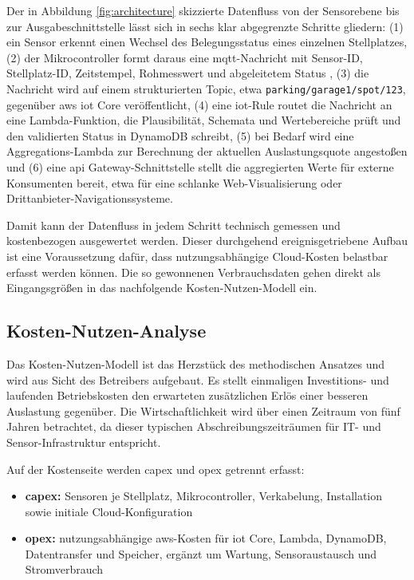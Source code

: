 Der in Abbildung \ref{fig:architecture} skizzierte Datenfluss von der Sensorebene bis zur Ausgabeschnittstelle lässt sich in sechs klar abgegrenzte Schritte gliedern:
(1) ein Sensor erkennt einen Wechsel des Belegungsstatus eines einzelnen Stellplatzes,
(2) der Mikrocontroller formt daraus eine \ac{mqtt}-Nachricht mit Sensor-ID, Stellplatz-ID, Zeitstempel, Rohmesswert und abgeleitetem Status \citep{sarkerSmartParkingSystem2020},
(3) die Nachricht wird auf einem strukturierten Topic, etwa \texttt{parking/garage1/spot/123}, gegenüber \ac{aws} \ac{iot} Core veröffentlicht,
(4) eine \ac{iot}-Rule routet die Nachricht an eine Lambda-Funktion, die Plausibilität, Schemata und Wertebereiche prüft und den validierten Status in DynamoDB schreibt,
(5) bei Bedarf wird eine Aggregations-Lambda zur Berechnung der aktuellen Auslastungsquote angestoßen und
(6) eine \ac{api} Gateway-Schnittstelle stellt die aggregierten Werte für externe Konsumenten bereit, etwa für eine schlanke Web-Visualisierung oder Drittanbieter-Navigationssysteme.

Damit kann der Datenfluss in jedem Schritt technisch gemessen und kostenbezogen ausgewertet werden. Dieser durchgehend ereignisgetriebene Aufbau ist eine Voraussetzung dafür, dass nutzungsabhängige Cloud-Kosten belastbar erfasst werden können. Die so gewonnenen Verbrauchsdaten gehen direkt als Eingangsgrößen in das nachfolgende Kosten-Nutzen-Modell ein.

\subsection{Kosten-Nutzen-Analyse}\label{sec:cost-benefit}

Das Kosten-Nutzen-Modell ist das Herzstück des methodischen Ansatzes und wird aus Sicht des Betreibers aufgebaut. Es stellt einmaligen Investitions- und laufenden Betriebskosten den erwarteten zusätzlichen Erlös einer besseren Auslastung gegenüber. Die Wirtschaftlichkeit wird über einen Zeitraum von fünf Jahren betrachtet, da dieser typischen Abschreibungszeiträumen für IT- und Sensor-Infrastruktur entspricht.

Auf der Kostenseite werden \ac{capex} und \ac{opex} getrennt erfasst:
\begin{itemize}
    \item \textbf{\ac{capex}:} Sensoren je Stellplatz, Mikrocontroller, Verkabelung, Installation sowie initiale Cloud-Konfiguration
    \item \textbf{\ac{opex}:} nutzungsabhängige \ac{aws}-Kosten für \ac{iot} Core, Lambda, DynamoDB, Datentransfer und Speicher, ergänzt um Wartung, Sensoraustausch und Stromverbrauch
\end{itemize}

